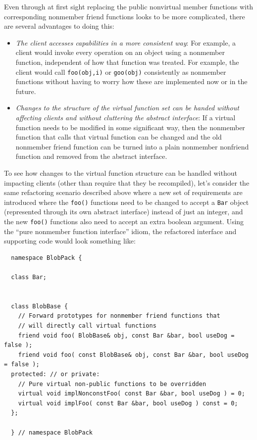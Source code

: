 \documentclass[pdf,ps2pdf,11pt]{SANDreport}
\begin{document}
Even through at first sight replacing the public nonvirtual member functions
with corresponding nonmember friend functions looks to be more complicated,
there are several advantages to doing this:

\begin{itemize}

{}\item\textit{The client accesses capabilities in a more consistent way}: For
example, a client would invoke every operation on an object using a nonmember
function, independent of how that function was treated.  For example, the
client would call {}\texttt{foo(obj,i)} or {}\texttt{goo(obj)} consistently as
nonmember functions without having to worry how these are implemented now or
in the future.

{}\item\textit{Changes to the structure of the virtual function set can be
handed without affecting clients and without cluttering the abstract
interface}: If a virtual function needs to be modified in some significant
way, then the nonmember function that calls that virtual function can be
changed and the old nonmember friend function can be turned into a plain
nonmember nonfriend function and removed from the abstract interface.

\end{itemize}

To see how changes to the virtual function structure can be handled without
impacting clients (other than require that they be recompiled), let's consider
the same refactoring scenario described above where a new set of requirements
are introduced where the {}\texttt{foo()} functions need to be changed to
accept a {}\texttt{Bar} object (represented through its own abstract
interface) instead of just an integer, and the new {}\texttt{foo()} functions
also need to accept an extra boolean argument.  Using the ``pure nonmember
function interface'' idiom, the refactored interface and supporting code would
look something like:

{\small\begin{verbatim}
  namespace BlobPack {

  class Bar;


  class BlobBase {
    // Forward prototypes for nonmember friend functions that
    // will directly call virtual functions
    friend void foo( BlobBase& obj, const Bar &bar, bool useDog = false );
    friend void foo( const BlobBase& obj, const Bar &bar, bool useDog = false );
  protected: // or private:
    // Pure virtual non-public functions to be overridden
    virtual void implNonconstFoo( const Bar &bar, bool useDog ) = 0;
    virtual void implFoo( const Bar &bar, bool useDog ) const = 0;
  };

  } // namespace BlobPack
\end{verbatim}}
\end{document}
